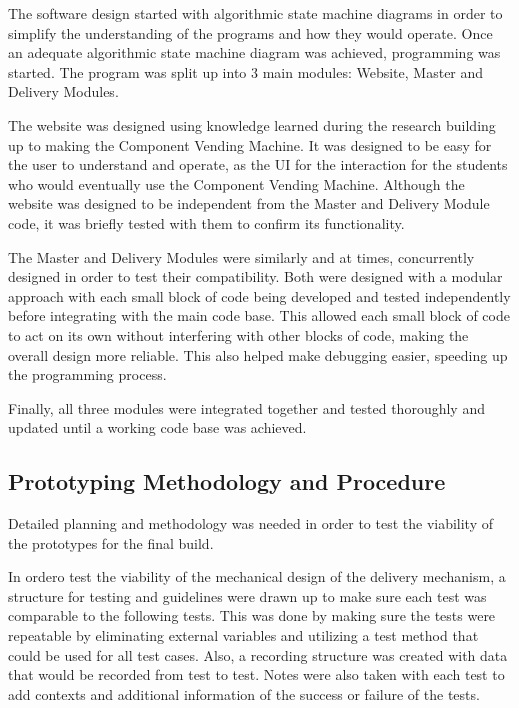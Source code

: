 \documentclass[a4paper,11pt]{article}
\numberwithin{figure}{section}
\numberwithin{table}{section}
\begin{document}
The software design started with algorithmic state machine diagrams in order to simplify the understanding of the programs and how they would operate. Once an adequate algorithmic state machine diagram was achieved, programming was started. The program was split up into 3 main modules: Website, Master and Delivery Modules. 

The website was designed using knowledge learned during the research building up to making the Component Vending Machine. It was designed to be easy for the user to understand and operate, as the UI for the interaction for the students who would eventually use the Component Vending Machine. Although the website was designed to be independent from the Master and Delivery Module code, it was briefly tested with them to confirm its functionality.

The Master and Delivery Modules were similarly and at times, concurrently designed in order to test their compatibility. Both were designed with a modular approach with each small block of code being developed and tested independently before integrating with the main code base. This allowed each small block of code to act on its own without interfering with other blocks of code, making the overall design more reliable. This also helped make debugging easier, speeding up the programming process.

Finally, all three modules were integrated together and tested thoroughly and updated until a working code base was achieved. 

\subsection[Prototyping Methodology and Procedure]{Prototyping Methodology and Procedure%
}

Detailed planning and methodology was needed in order to test the viability of the prototypes for the final build.

In ordero test the viability of the mechanical design of the delivery mechanism, a structure for testing and guidelines were drawn up to make sure each test was comparable to the following tests. This was done by making sure the tests were repeatable by eliminating external variables and utilizing a test method that could be used for all test cases. Also, a recording structure was created with data that would be recorded from test to test. Notes were also taken with each test to add contexts and additional information of the success or failure of the tests.
\end{document}
